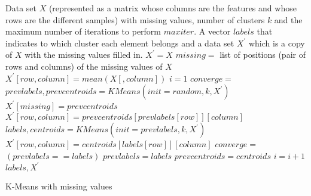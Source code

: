 \begin{algorithm}
\begin{algorithmic}[1]
	\REQUIRE Data set $X$ (represented as a matrix whose columns are the features and whose rows are the different samples) with missing values, number of clusters $k$ and the maximum number of iterations to perform $maxiter$.
	\ENSURE A vector $labels$ that indicates to which cluster each element belongs and a data set $X^\prime$ which is a copy of $X$ with the missing values filled in.
	\STATE $X^\prime = X$
	\STATE $missing = $ list of positions (pair of rows and columns) of the missing values of $X$
	\STATE $X^\prime[row, column] = mean(X[, column])$
	\ENDFOR
	\STATE $i = 1$
	\STATE $converge =$ \FALSE
	\STATE $prevlabels, prevcentroids = KMeans(init = random, k, X^\prime)$
	\STATE $X^\prime[missing] = prevcentroids$
	\STATE $X^\prime[row, column] = prevcentroids[prevlabels[row]][column]$
	\ENDFOR
	\STATE $labels, centroids = KMeans(init = prevlabels, k, X^\prime)$
	\STATE $X^\prime[row, column] = centroids[labels[row]][column]$
	\ENDFOR
	\STATE $converge =$ $(prevlabels == labels)$
	\STATE $prevlabels = labels$
	\STATE $prevcentroids = centroids$
	\STATE $i = i + 1$
	\ENDIF
	\ENDWHILE
	\RETURN $labels, X^\prime$
\end{algorithmic}
\caption{K-Means with missing values}\label{alg:kpod}
\end{algorithm}